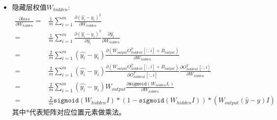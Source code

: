 \documentclass[UTF8]{ctexart}
\begin{document}
\begin{itemize}
    \item 隐藏层权值$W_{hidden}$:
    \begin{equation*}
        \begin{aligned}
            \frac{\partial loss}{\partial W_{hidden}} =& \frac{1}{m} \sum_{i=1}^{m} \frac{\partial (\hat{y_i}-y_i)^2}{\partial W_{hidden}}  \\
            =& \frac{1}{m} \sum_{i=1}^m \frac{\partial (\hat{y_i}-y_i)^2}{\partial \hat{y_i}} \frac{\partial \hat{y_i}}{\partial W_{hidden}} \\
            =& \frac{2}{m} \sum_{i=1}^m  (\hat{y_i}-y_i) \frac{\partial (W_{output} O_{hiddent}^T[:,i] + B_{output})}{\partial W_{hidden}} \\
            =& \frac{2}{m} \sum_{i=1}^m  (\hat{y_i}-y_i) \frac{\partial (W_{output} O_{hiddent}^T[:,i] + B_{output})}{\partial O_{hiddent}^T[:,i]} \frac{\partial O_{hiddent}^T[:,i]}{\partial W_{hidden}} \\
            =&  \frac{2}{m} \sum_{i=1}^m  (\hat{y_i}-y_i) W_{output} \frac{\partial \texttt{sigmoid}(W_{hidden}I_i)}{\partial W_{hidden}} \\
            =& \frac{2}{m} \texttt{sigmoid}(W_{hidden}I)*(1-\texttt{sigmoid}(W_{hidden}I)) * (W_{output}(\hat{y}-y)I)
        \end{aligned}
    \end{equation*}
    其中*代表矩阵对应位置元素做乘法。
\end{itemize}
\end{document}
